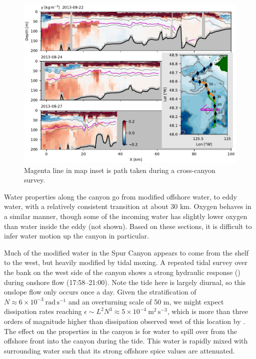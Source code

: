 \documentclass[draft]{agujournal2019}
\begin{document}
\begin{figure}[htbp]
  \begin{center}
    \includegraphics[width=6.2in]{CanyonPropertiesSpice}
    \caption{Magenta line in map inset is path taken during a cross-canyon survey.
      \label{fig:CanyonPropertiesSpice} }
  \end{center}
\end{figure}

Water properties along the canyon go from modified offshore water, to eddy water, with a relatively consistent transition at about 30 km.  Oxygen behaves in a similar manner, though some of the incoming water has slightly lower oxygen than water inside the eddy (not shown).  Based on these sections, it is difficult to infer water motion up the canyon in particular.

Much of the modified water in the Spur Canyon appears to come from the shelf to the west, but heavily modified by tidal moxing. A repeated tidal survey over the bank on the west side of the canyon shows a strong hydraulic response () during onshore flow (17:58--21:00).  Note the tide here is largely diurnal, so this onslope flow only occurs once a day.  Given the stratification of $N\approx 6\times10^{-3} \ \mathrm{rad\,s^{-1}}$ and an overturning scale of 50 m, we might expect dissipation rates reaching $\epsilon \sim L^2N^{3} \approx 5\times10^{-4}\ \mathrm{m^2\,s^{-3}}$, which is more than three orders of magnitude higher than dissipation observed west of this location by \cite{deweycrawford88}.  The effect on the properties in the canyon is for water to spill over from the offshore front into the canyon during the tide.  This water is rapidly mixed with surrounding water such that its strong offshore spice values are attenuated.
\end{document}
